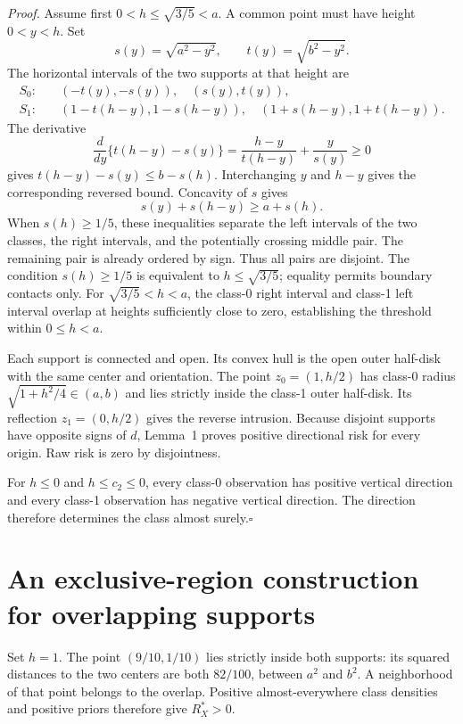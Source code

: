 \emph{Proof.}
Assume first $0<h\leq\sqrt{3/5}<a$. A common point must have height $0<y<h$. Set
\[
 s(y)=\sqrt{a^2-y^2},\qquad t(y)=\sqrt{b^2-y^2}.
\]
The horizontal intervals of the two supports at that height are
\begin{align*}
 S_0:&\quad(-t(y),-s(y)),\quad(s(y),t(y)),\\
 S_1:&\quad(1-t(h-y),1-s(h-y)),\quad
                  (1+s(h-y),1+t(h-y)).
\end{align*}
The derivative
\[
 \frac{d}{dy}\{t(h-y)-s(y)\}
 =\frac{h-y}{t(h-y)}+\frac y{s(y)}\geq0
\]
gives $t(h-y)-s(y)\leq b-s(h)$. Interchanging $y$ and $h-y$ gives the corresponding reversed bound. Concavity of $s$ gives
\[
 s(y)+s(h-y)\geq a+s(h).
\]
When $s(h)\geq1/5$, these inequalities separate the left intervals of the two classes, the right intervals, and the potentially crossing middle pair. The remaining pair is already ordered by sign. Thus all pairs are disjoint. The condition $s(h)\geq1/5$ is equivalent to $h\leq\sqrt{3/5}$; equality permits boundary contacts only. For $\sqrt{3/5}<h<a$, the class-0 right interval and class-1 left interval overlap at heights sufficiently close to zero, establishing the threshold within $0\leq h<a$.

Each support is connected and open. Its convex hull is the open outer half-disk with the same center and orientation. The point $z_0=(1,h/2)$ has class-0 radius $\sqrt{1+h^2/4}\in(a,b)$ and lies strictly inside the class-1 outer half-disk. Its reflection $z_1=(0,h/2)$ gives the reverse intrusion. Because disjoint supports have opposite signs of $d$, Lemma~1 proves positive directional risk for every origin. Raw risk is zero by disjointness.

For $h\leq0$ and $h\leq c_2\leq0$, every class-0 observation has positive vertical direction and every class-1 observation has negative vertical direction. The direction therefore determines the class almost surely.\hfill$\square$

\section{An exclusive-region construction for overlapping supports}
\label{supp:overlap}

Set $h=1$. The point $(9/10,1/10)$ lies strictly inside both supports: its squared distances to the two centers are both $82/100$, between $a^2$ and $b^2$. A neighborhood of that point belongs to the overlap. Positive almost-everywhere class densities and positive priors therefore give $R_X^*>0$.

